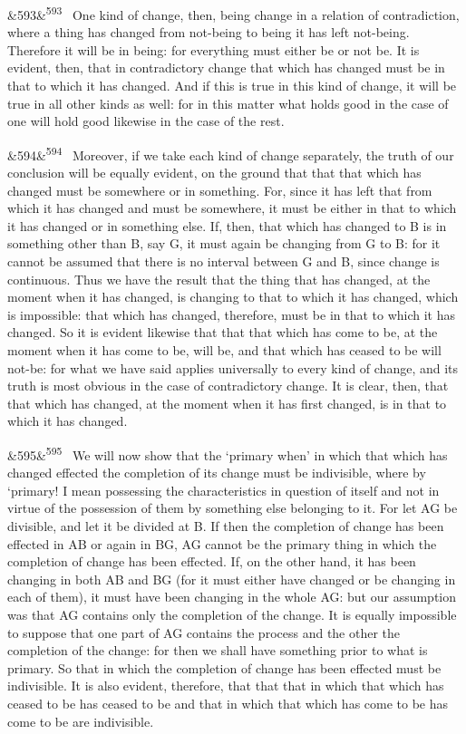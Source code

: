 \documentclass[12pt]{article}
\newcommand{\para}[1][]{\par\noindent\ifx&#1&\else\textsuperscript{\footnotesize #1}~\fi}
\begin{document}
\para[593] One kind of change, then, being change in a relation of contradiction, where a thing has changed from not-being to being it has left not-being. Therefore it will be in being: for everything must either be or not be. It is evident, then, that in contradictory change that which has changed must be in that to which it has changed. And if this is true in this kind of change, it will be true in all other kinds as well: for in this matter what holds good in the case of one will hold good likewise in the case of the rest.

\para[594] Moreover, if we take each kind of change separately, the truth of our conclusion will be equally evident, on the ground that that that which has changed must be somewhere or in something. For, since it has left that from which it has changed and must be somewhere, it must be either in that to which it has changed or in something else. If, then, that which has changed to B is in something other than B, say G, it must again be changing from G to B: for it cannot be assumed that there is no interval between G and B, since change is continuous. Thus we have the result that the thing that has changed, at the moment when it has changed, is changing to that to which it has changed, which is impossible: that which has changed, therefore, must be in that to which it has changed. So it is evident likewise that that that which has come to be, at the moment when it has come to be, will be, and that which has ceased to be will not-be: for what we have said applies universally to every kind of change, and its truth is most obvious in the case of contradictory change. It is clear, then, that that which has changed, at the moment when it has first changed, is in that to which it has changed.

\para[595] We will now show that the ‘primary when' in which that which has changed effected the completion of its change must be indivisible, where by ‘primary! I mean possessing the characteristics in question of itself and not in virtue of the possession of them by something else belonging to it. For let AG be divisible, and let it be divided at B. If then the completion of change has been effected in AB or again in BG, AG cannot be the primary thing in which the completion of change has been effected. If, on the other hand, it has been changing in both AB and BG (for it must either have changed or be changing in each of them), it must have been changing in the whole AG: but our assumption was that AG contains only the completion of the change. It is equally impossible to suppose that one part of AG contains the process and the other the completion of the change: for then we shall have something prior to what is primary. So that in which the completion of change has been effected must be indivisible. It is also evident, therefore, that that that in which that which has ceased to be has ceased to be and that in which that which has come to be has come to be are indivisible.
\end{document}
